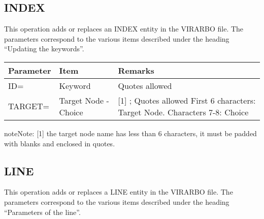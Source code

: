 \documentclass[letterpaper,10pt,english]{sphinxmanual}
\begin{document}
\subsection{INDEX}
\label{\detokenize{Installation_Guide:index}}\label{\detokenize{Installation_Guide:index-164}}
This operation adds or replaces an INDEX entity in the VIRARBO file. The parameters correspond to the various items described under the heading “Updating the keywords”.


\begin{savenotes}\sphinxattablestart
\centering
\begin{tabulary}{\linewidth}[t]{|T|T|T|}
\hline
\sphinxstyletheadfamily 
Parameter
&\sphinxstyletheadfamily 
Item
&\sphinxstyletheadfamily 
Remarks
\\
\hline
ID=
&
Keyword
&
Quotes allowed
\\
\hline
TARGET=
&
Target Node -
Choice
&
{[}1{]} ; Quotes allowed
First 6 characters: Target Node.
Characters 7-8: Choice
\\
\hline
\end{tabulary}
\par
\sphinxattableend\end{savenotes}

\begin{sphinxadmonition}{note}{Note:}
{[}1{]} the target node name has less than 6 characters, it must be padded with blanks and enclosed in quotes.
\end{sphinxadmonition}

\ignorespaces 

\subsection{LINE}
\label{\detokenize{Installation_Guide:line}}\label{\detokenize{Installation_Guide:index-165}}
This operation adds or replaces a LINE entity in the VIRARBO file. The parameters correspond to the various items described under the heading “Parameters of the line”.
\end{document}
